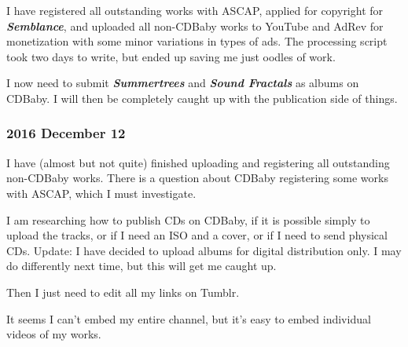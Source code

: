 \documentclass[english,11pt,letterpaper,onecolumn]{scrartcl}
\begin{document}
I have registered all outstanding works with ASCAP, applied for copyright for \emph{\textbf{Semblance}}, and uploaded all non-CDBaby works to YouTube and AdRev for monetization with some minor variations in types of ads. The processing script took two days to write, but ended up saving me just oodles of work.

I now need to submit \emph{\textbf{Summertrees}} and \emph{\textbf{Sound Fractals}} as albums on CDBaby. I will then be completely caught up with the publication side of things.

\subsubsection*{2016 December 12}

I have (almost but not quite) finished uploading and registering all outstanding non-CDBaby works. There is a question about CDBaby registering some works with ASCAP, which I must investigate.

I am researching how to publish CDs on CDBaby, if it is possible simply to upload the tracks, or if I need an ISO and a cover, or if I need to send physical CDs. Update: I have decided to upload albums for digital distribution only. I may do differently next time, but this will get me caught up.

Then I just need to edit all my links on Tumblr.

It seems I can't embed my entire channel, but it's easy to embed individual videos of my works.
\end{document}
